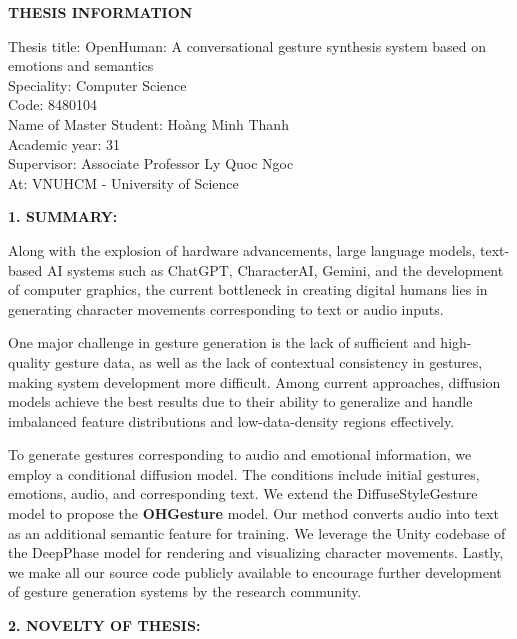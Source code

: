 
\pagebreak
{}
{}
\begin{center}
	{\centering \MakeUppercase \LARGE \fontsize{16.16}{19.26}\selectfont \bfseries THESIS INFORMATION}
\end{center}



{
	\setlength{\parindent}{0pt}
Thesis title: OpenHuman: A conversational gesture synthesis system based on emotions and semantics \\
Speciality: Computer Science \\
Code: 8480104\\
Name of Master Student: Hoàng Minh Thanh \\
Academic year: 31\\
Supervisor: Associate Professor Ly Quoc Ngoc\\
At: VNUHCM - University of Science}


\vspace{5pt}
{\MakeUppercase\Large \bfseries{1. SUMMARY:}}

Along with the explosion of hardware advancements, large language models, text-based AI systems such as ChatGPT, CharacterAI, Gemini, and the development of computer graphics, the current bottleneck in creating digital humans lies in generating character movements corresponding to text or audio inputs.

One major challenge in gesture generation is the lack of sufficient and high-quality gesture data, as well as the lack of contextual consistency in gestures, making system development more difficult. Among current approaches, diffusion models achieve the best results due to their ability to generalize and handle imbalanced feature distributions and low-data-density regions effectively.

To generate gestures corresponding to audio and emotional information, we employ a conditional diffusion model. The conditions include initial gestures, emotions, audio, and corresponding text. We extend the DiffuseStyleGesture model to propose the \textbf{OHGesture} model. Our method converts audio into text as an additional semantic feature for training. We leverage the Unity codebase of the DeepPhase model for rendering and visualizing character movements. Lastly, we make all our source code publicly available to encourage further development of gesture generation systems by the research community.


\vspace{5pt}
{\MakeUppercase\Large \bfseries 2. NOVELTY OF THESIS:}



